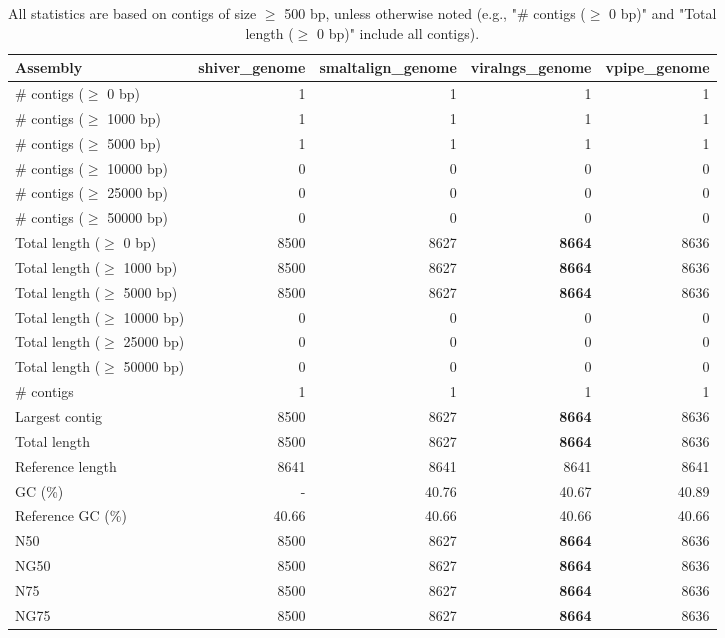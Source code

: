 \documentclass[12pt,a4paper]{article}
\begin{document}
\begin{table}[ht]
\begin{center}
\caption{All statistics are based on contigs of size $\geq$ 500 bp, unless otherwise noted (e.g., "\# contigs ($\geq$ 0 bp)" and "Total length ($\geq$ 0 bp)" include all contigs).}
\begin{tabular}{|l*{4}{|r}|}
\hline
Assembly & shiver\_genome & smaltalign\_genome & viralngs\_genome & vpipe\_genome \\ \hline
\# contigs ($\geq$ 0 bp) & 1 & 1 & 1 & 1 \\ \hline
\# contigs ($\geq$ 1000 bp) & 1 & 1 & 1 & 1 \\ \hline
\# contigs ($\geq$ 5000 bp) & 1 & 1 & 1 & 1 \\ \hline
\# contigs ($\geq$ 10000 bp) & 0 & 0 & 0 & 0 \\ \hline
\# contigs ($\geq$ 25000 bp) & 0 & 0 & 0 & 0 \\ \hline
\# contigs ($\geq$ 50000 bp) & 0 & 0 & 0 & 0 \\ \hline
Total length ($\geq$ 0 bp) & 8500 & 8627 & {\bf 8664} & 8636 \\ \hline
Total length ($\geq$ 1000 bp) & 8500 & 8627 & {\bf 8664} & 8636 \\ \hline
Total length ($\geq$ 5000 bp) & 8500 & 8627 & {\bf 8664} & 8636 \\ \hline
Total length ($\geq$ 10000 bp) & 0 & 0 & 0 & 0 \\ \hline
Total length ($\geq$ 25000 bp) & 0 & 0 & 0 & 0 \\ \hline
Total length ($\geq$ 50000 bp) & 0 & 0 & 0 & 0 \\ \hline
\# contigs & 1 & 1 & 1 & 1 \\ \hline
Largest contig & 8500 & 8627 & {\bf 8664} & 8636 \\ \hline
Total length & 8500 & 8627 & {\bf 8664} & 8636 \\ \hline
Reference length & 8641 & 8641 & 8641 & 8641 \\ \hline
GC (\%) & - & 40.76 & 40.67 & 40.89 \\ \hline
Reference GC (\%) & 40.66 & 40.66 & 40.66 & 40.66 \\ \hline
N50 & 8500 & 8627 & {\bf 8664} & 8636 \\ \hline
NG50 & 8500 & 8627 & {\bf 8664} & 8636 \\ \hline
N75 & 8500 & 8627 & {\bf 8664} & 8636 \\ \hline
NG75 & 8500 & 8627 & {\bf 8664} & 8636 \\ \hline

\end{tabular}
\end{center}
\end{table}
\end{document}

